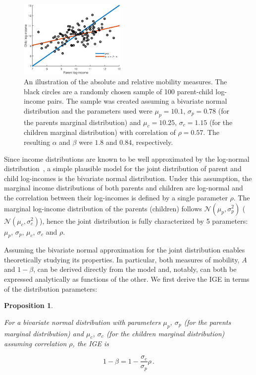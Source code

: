 \documentclass[final,10pt,5p,twocolumn,authoryear]{elsarticle}
\newtheorem{proposition}{Proposition}
\newcommand{\elabel}[1]{\label{eq:#1}}
\newcommand{\flabel}[1]{\label{fig:#1}}
\newcommand{\be}{\begin{equation}}
\newcommand{\ee}{\end{equation}}
\numberwithin{equation}{section}
\begin{document}
\begin{figure}[!htb]
\centering
\includegraphics[width=0.46\textwidth]{./figs/bivariate_lines3.eps}
\caption{An illustration of the absolute and relative mobility measures. The black circles are a randomly chosen sample of 100 parent-child log-income pairs. The sample was created assuming a bivariate normal distribution and the parameters used were $\mu_p=10.1$, $\sigma_p=0.78$ (for the parents marginal distribution) and $\mu_c=10.25$, $\sigma_c=1.15$ (for the children marginal distribution) with correlation of $\rho=0.57$. The resulting $\alpha$ and $\beta$ were $1.8$ and $0.84$, respectively.}
\flabel{lines}
\end{figure}

Since income distributions are known to be well approximated by the log-normal distribution~\citep{pinkovskiy2009parametric}, a simple plausible model for the joint distribution of parent and child log-incomes is the bivariate normal distribution. Under this assumption, the marginal income distributions of both parents and children are log-normal and the correlation between their log-incomes is defined by a single parameter $\rho$. The marginal log-income distribution of the parents (children) follows $\mathcal{N}\left(\mu_p,\sigma_p^2\right)$ ($\mathcal{N}\left(\mu_c,\sigma_c^2\right)$), hence the joint distribution is fully characterized by 5 parameters: $\mu_p$, $\sigma_p$, $\mu_c$, $\sigma_c$ and $\rho$.

Assuming the bivariate normal approximation for the joint distribution enables theoretically studying its properties. In particular, both measures of mobility, $A$ and $1-\beta$, can be derived directly from the model and, notably, can both be expressed analytically as functions of the other. We first derive the IGE in terms of the distribution parameters:

\begin{proposition}
\label{prop:prop1}

For a bivariate normal distribution with parameters $\mu_p$, $\sigma_p$ (for the parents marginal distribution) and $\mu_c$, $\sigma_c$ (for the children marginal distribution) assuming correlation $\rho$, the IGE is

\be
1-\beta = 1-\frac{\sigma_c}{\sigma_p}\rho \,.
\elabel{beta_rho}
\ee
\end{proposition}
\end{document}
